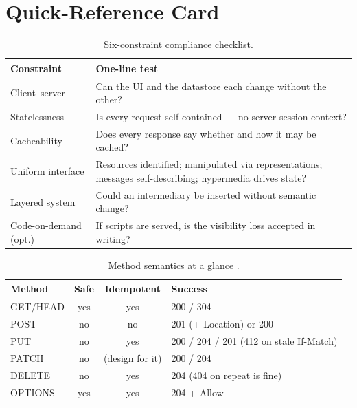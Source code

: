 \section{Quick-Reference Card}

\begin{table}[h]
  \centering
  \small
  \begin{tabularx}{\textwidth}{l X}
    \toprule
    \textbf{Constraint} & \textbf{One-line test} \\
    \midrule
    Client--server & Can the UI and the datastore each change without the other? \\
    Statelessness & Is every request self-contained --- no server session context? \\
    Cacheability & Does every response say whether and how it may be cached? \\
    Uniform interface & Resources identified; manipulated via representations; messages self-describing; hypermedia drives state? \\
    Layered system & Could an intermediary be inserted without semantic change? \\
    Code-on-demand (opt.) & If scripts are served, is the visibility loss accepted in writing? \\
    \bottomrule
  \end{tabularx}
  \caption{Six-constraint compliance checklist.}
\end{table}

\begin{table}[h]
  \centering
  \small
  \begin{tabular}{l c c l}
    \toprule
    \textbf{Method} & \textbf{Safe} & \textbf{Idempotent} & \textbf{Success} \\
    \midrule
    GET/HEAD & yes & yes & 200 / 304 \\
    POST     & no  & no  & 201 (+ Location) or 200 \\
    PUT      & no  & yes & 200 / 204 / 201 (412 on stale If-Match) \\
    PATCH    & no  & (design for it) & 200 / 204 \\
    DELETE   & no  & yes & 204 (404 on repeat is fine) \\
    OPTIONS  & yes & yes & 204 + Allow \\
    \bottomrule
  \end{tabular}
  \caption{Method semantics at a glance \cite{rfc9110}.}
\end{table}

